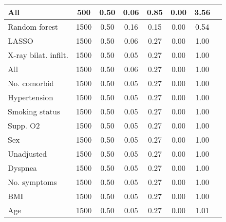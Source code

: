 \documentclass{article}
\begin{document}
{\begin{longtable}{lccccccc}
All & 500 & 0.50 & 0.06 & 0.85 &  0.00 &  3.56 \\ \midrule() 
Random forest & 1500 & 0.50 & 0.16 & 0.15 &  0.00 &  0.54 \\ 
LASSO & 1500 & 0.50 & 0.06 & 0.27 &  0.00 &  1.00 \\ 
X-ray bilat. infilt. & 1500 & 0.50 & 0.05 & 0.27 &  0.00 &  1.00 \\ 
All & 1500 & 0.50 & 0.06 & 0.27 &  0.00 &  1.00 \\ 
No. comorbid & 1500 & 0.50 & 0.05 & 0.27 &  0.00 &  1.00 \\ 
Hypertension & 1500 & 0.50 & 0.05 & 0.27 &  0.00 &  1.00 \\ 
Smoking status & 1500 & 0.50 & 0.05 & 0.27 &  0.00 &  1.00 \\ 
Supp. O2 & 1500 & 0.50 & 0.05 & 0.27 &  0.00 &  1.00 \\ 
Sex & 1500 & 0.50 & 0.05 & 0.27 &  0.00 &  1.00 \\ 
Unadjusted & 1500 & 0.50 & 0.05 & 0.27 &  0.00 &  1.00 \\ 
Dyspnea & 1500 & 0.50 & 0.05 & 0.27 &  0.00 &  1.00 \\ 
No. symptoms & 1500 & 0.50 & 0.05 & 0.27 &  0.00 &  1.00 \\ 
BMI & 1500 & 0.50 & 0.05 & 0.27 &  0.00 &  1.00 \\ 
Age & 1500 & 0.50 & 0.05 & 0.27 &  0.00 &  1.01 \\
\bottomrule
\hline
\end{longtable}
}

\clearpage
\end{document}

